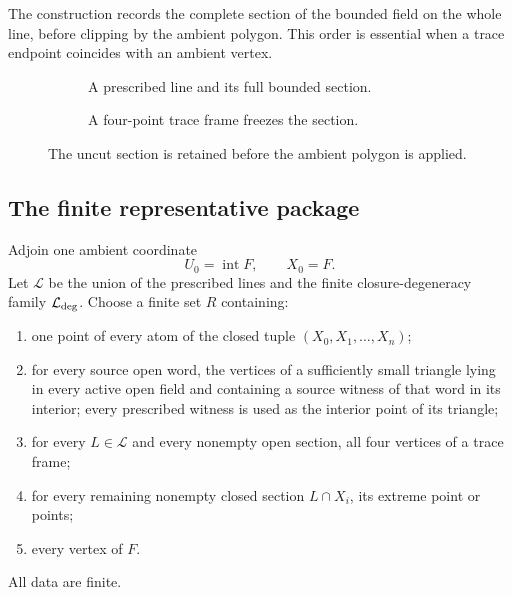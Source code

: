 The construction records the complete section of the bounded field on the
whole line, before clipping by the ambient polygon.  This order is essential
when a trace endpoint coincides with an ambient vertex.

\begin{figure}[t]
\centering
\begin{subfigure}[t]{.47\textwidth}
\centering

\caption{A prescribed line and its full bounded section.}
\end{subfigure}\hfill
\begin{subfigure}[t]{.47\textwidth}
\centering

\caption{A four-point trace frame freezes the section.}
\end{subfigure}
\caption{The uncut section is retained before the ambient polygon is
applied.}
\label{fig:traceframe}
\end{figure}

\subsection{The finite representative package}

Adjoin one ambient coordinate
\[
 U_0=\operatorname{int}F,\qquad X_0=F.
\]
Let $\mathcal L$ be the union of the prescribed lines and the finite
closure-degeneracy family $\mathcal L_{\rm deg}$.  Choose a finite set
$R$ containing:
\begin{enumerate}
\item one point of every atom of the closed tuple
      $(X_0,X_1,\ldots,X_n)$;
\item for every source open word, the vertices of a sufficiently small
      triangle lying in every active open field and containing a source
      witness of that word in its interior; every prescribed witness is
      used as the interior point of its triangle;
\item for every $L\in\mathcal L$ and every nonempty open section, all four
      vertices of a trace frame;
\item for every remaining nonempty closed section $L\cap X_i$, its extreme
      point or points;
\item every vertex of $F$.
\end{enumerate}
All data are finite.

